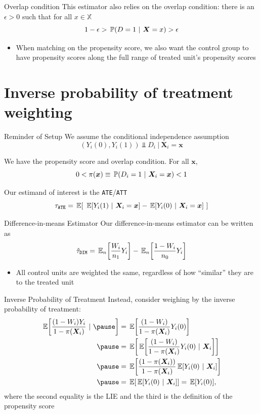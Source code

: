 \documentclass[aspectratio=169,t,11pt,table]{beamer}
\begin{document}
\begin{frame}{Overlap condition}
  This estimator also relies on the overlap condition: there is an $\epsilon > 0$ such that for all $x \in \mathbb{X}$
  $$
    1 - \epsilon > \prob{D = 1}{\bm{X} = x} > \epsilon
  $$
  \begin{itemize}
    \item When matching on the propensity score, we also want the control group to have propensity scores along the full range of treated unit's propensity scores
  \end{itemize}
\end{frame}

\section{Inverse probability of treatment weighting}

\begin{frame}{Reminder of Setup}
  We assume the conditional independence assumption
  $$
    (Y_{i}(0), Y_{i}(1)) \Perp D_i \ \vert \ \bm{X}_i = \bm{x}
  $$

  We have the propensity score and overlap condition. For all $\bm{x}$,
  $$
    0 < \pi(\bm{x}) \equiv \prob{D_i = 1}{\bm{X}_i = \bm{x}} < 1
  $$

  Our estimand of interest is the \texttt{ATE}/\texttt{ATT}
  $$
    \tau_{\texttt{ATE}} = \expec{\ \expec{Y_i(1)}{\bm{X}_i = \bm{x}} - \expec{Y_i(0)}{\bm{X}_i = \bm{x}} \ }
  $$
\end{frame}

\begin{frame}{Difference-in-means Estimator}
  Our difference-in-means estimator can be written as 
  $$
    \hat{\tau}_{\texttt{DIM}} = \expec[n]{\frac{W_i}{n_1} Y_i} - \expec[n]{\frac{1 - W_i}{n_0} Y_i}
  $$
  \begin{itemize}
    \item All control units are weighted the same, regardless of how ``similar'' they are to the treated unit
  \end{itemize}
\end{frame}

\begin{frame}{Inverse Probability of Treatment}
  Instead, consider weighing by the inverse probability of treatment:
  \begin{align*}
    \expec{\frac{(1 - W_i) Y_i}{1 - \pi(\bm{X}_i)}} \pause 
    &= \expec{\frac{(1 - W_i)}{1 - \pi(\bm{X}_i)} Y_i(0)} \\ \pause
    &= \expec{\expec{\frac{(1 - W_i) }{1 - \pi(\bm{X}_i)} Y_i(0)}{\bm{X}_i}} \\ \pause
    &= \expec{\frac{(1 - \pi(\bm{X}_i))}{1 - \pi(\bm{X}_i)} \expec{Y_i(0)}{\bm{X}_i}} \\ \pause
    &= \expec{\expec{Y_i(0)}{\bm{X}_i}} = \expec{Y_i(0)},
  \end{align*}
  where the second equality is the LIE and the third is the definition of the propensity score
\end{frame}
\end{document}
